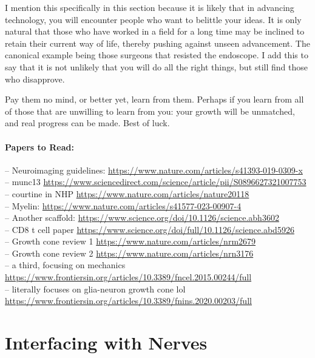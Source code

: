 \documentclass[12pt]{report}
\begin{document}
I mention this specifically in this section because it is likely that in advancing technology, you will encounter people who want to belittle your ideas. It is only natural that those who have worked in a field for a long time may be inclined to retain their current way of life, thereby pushing against unseen advancement. The canonical example being those surgeons that resisted the endoscope. I add this to say that it is not unlikely that you will do all the right things, but still find those who disapprove.\newline

Pay them no mind, or better yet, learn from them. Perhaps if you learn from all of those that are unwilling to learn from you: your growth will be unmatched, and real progress can be made. Best of luck. 

\subsubsection{Papers to Read:}

-- Neuroimaging guidelines: \url{https://www.nature.com/articles/s41393-019-0309-x}\\
-- munc13 \url{https://www.sciencedirect.com/science/article/pii/S0896627321007753}\\
-- courtine in NHP \url{https://www.nature.com/articles/nature20118}\\
-- Myelin: \url{https://www.nature.com/articles/s41577-023-00907-4} \\
-- Another scaffold: \url{https://www.science.org/doi/10.1126/science.abh3602}\\
-- CD8 t cell paper \url{https://www.science.org/doi/full/10.1126/science.abd5926}\\
-- Growth cone review 1 \url{https://www.nature.com/articles/nrm2679} \\
-- Growth cone review 2 \url{https://www.nature.com/articles/nrn3176} \\
-- a third, focusing on mechanics \url{https://www.frontiersin.org/articles/10.3389/fncel.2015.00244/full} \\
-- literally focuses on glia-neuron growth cone lol \url{https://www.frontiersin.org/articles/10.3389/fnins.2020.00203/full} \\

\chapter{Interfacing with Nerves}
\end{document}
